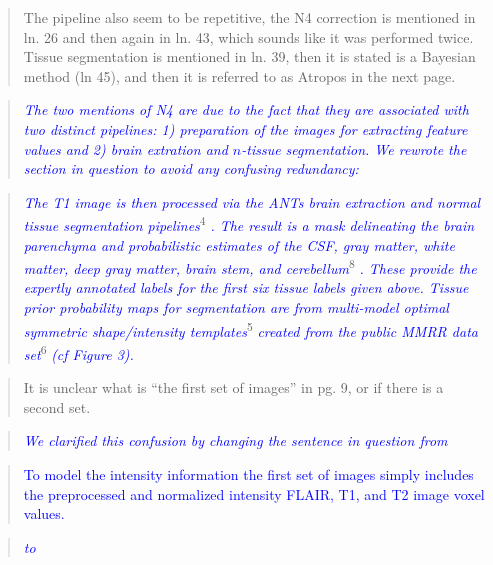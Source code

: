 \documentclass[12pt,]{article}
\begin{document}
\begin{quote}
The pipeline also seem to be repetitive, the N4 correction is mentioned
in ln. 26 and then again in ln. 43, which sounds like it was performed
twice. Tissue segmentation is mentioned in ln. 39, then it is stated is
a Bayesian method (ln 45), and then it is referred to as Atropos in the
next page.
\end{quote}

\begin{quote}
\emph{\textcolor{blue}{The two mentions of N4 are due to the fact that they are associated
with two distinct pipelines:  1) preparation of the images for extracting feature values
and 2) brain extration and $n$-tissue segmentation.  We rewrote the section in question
to avoid any confusing redundancy:}}
\end{quote}

\begin{quote}
\emph{\textcolor{blue}{The T1 image is then processed via the ANTs brain
extraction and normal tissue segmentation pipelines}}\textsuperscript{4}
\emph{\textcolor{blue}{.  The result is a mask delineating the brain
parenchyma and probabilistic estimates of the CSF, gray matter, white matter,
deep gray matter, brain stem, and cerebellum}}\textsuperscript{8}
\emph{\textcolor{blue}{.  These provide the expertly annotated labels for the
first six tissue labels given above.  Tissue prior probability maps for segmentation
are from multi-model optimal symmetric shape/intensity templates}}\textsuperscript{5}
\emph{\textcolor{blue}{created from the public MMRR data set}}\textsuperscript{6}
\emph{\textcolor{blue}{(cf Figure 3).}}
\end{quote}

\begin{quote}
It is unclear what is ``the first set of images'' in pg. 9, or if there
is a second set.
\end{quote}

\begin{quote}
\emph{\textcolor{blue}{We clarified this confusion by changing the sentence in question from}}
\end{quote}

\begin{quote}
\textcolor{blue}{To model the intensity information the first set of images simply includes the
preprocessed and normalized intensity FLAIR, T1, and T2 image voxel values.}
\end{quote}

\begin{quote}
\emph{\textcolor{blue}{to}}
\end{quote}
\end{document}

